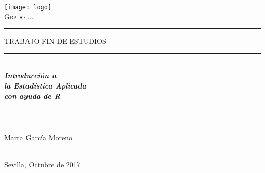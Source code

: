 \documentclass[12pt,a4paper,oneside,]{book}
\title{}
\author{}
\date{}
\numberwithin{dummy}{section}
\theoremstyle{ocrenumbox}
\theoremstyle{blacknumex}
\theoremstyle{blacknumbox}
\theoremstyle{ocrenum}
\theoremstyle{ocrenum}
\begin{document}



\begin{titlepage}

\newcommand{\HRule}{\rule{\linewidth}{0.5mm}} %

\center %


\begin{minipage}{14cm}
\center

\texttt{[image: logo]}\\[0.5cm] %


\textsc{\LARGE Grado ...}\\[2.5cm] 



\rule[1.7mm]{2cm}{0.5mm}
\hfill
\textsc{\Large TRABAJO FIN DE ESTUDIOS} 
\hfill
\rule[1.7mm]{2cm}{0.5mm} 
\\[0.75cm]

{\Huge
\textbf{\textit{
Introducción a \\[0.2cm]
la Estadística Aplicada \\[0.5cm]
con ayuda de R
}}}\\[0.75cm] 

\HRule \\[4cm]


{\Large

Marta García Moreno} \\[0.5cm]

{\large
Sevilla, Octubre de 2017
}

\end{minipage}

\vfill %

\cleardoublepage
\thispagestyle{empty}
\end{titlepage}
\end{document}
